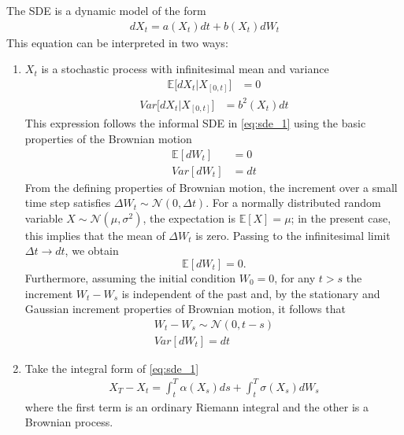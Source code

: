 The SDE is a dynamic model of the form
\begin{align}\label{eq:sde_1}
dX_t=a(X_t)dt + b(X_t)dW_t
\end{align}
This equation can be interpreted in two ways:
\begin{enumerate}
\item[A.] $X_t$ is a stochastic process with infinitesimal mean and variance
\begin{align}\label{eq:expected}
\mathbb{E}\big[dX_t|X_{[0,t]}\big] &= 0
\end{align}
\begin{align}\label{eq:variance}
Var\big[dX_t|X_{[0,t]}\big] &= b^2(X_t)dt
\end{align}
This expression follows the informal SDE in \eqref{eq:sde_1} using the basic properties of the Brownian motion
\begin{align*}
\mathbb{E}[dW_t] &= 0\\
Var[dW_t] &= dt
\end{align*}
From the defining properties of Brownian motion, the increment over a small time step satisfies \(\Delta W_t \sim \mathcal{N}(0,\Delta t)\). For a normally distributed random variable \(X \sim \mathcal{N}(\mu,\sigma^2)\), the expectation is \(\mathbb{E}[X] = \mu\); in the present case, this implies that the mean of \(\Delta W_t\) is zero. Passing to the infinitesimal limit \(\Delta t \to dt\), we obtain
\[
\mathbb{E}[dW_t] = 0.
\]
Furthermore, assuming the initial condition \(W_0 = 0\), for any \(t > s\) the increment \(W_t - W_s\) is independent of the past and, by the stationary and Gaussian increment properties of Brownian motion, it follows that
\begin{align*}
W_t - W_s \sim \mathcal{N}(0, t-s)\\
Var[dW_t] = dt \qquad
\end{align*}

\item[B.] Take the integral form of \eqref{eq:sde_1}
\begin{align*}
X_T-X_t = \int_t^T \alpha(X_s)ds + \int_t^T \sigma(X_s)dW_s
\end{align*}
where the first term is an ordinary Riemann integral and the other is a Brownian process. 
\end{enumerate}

